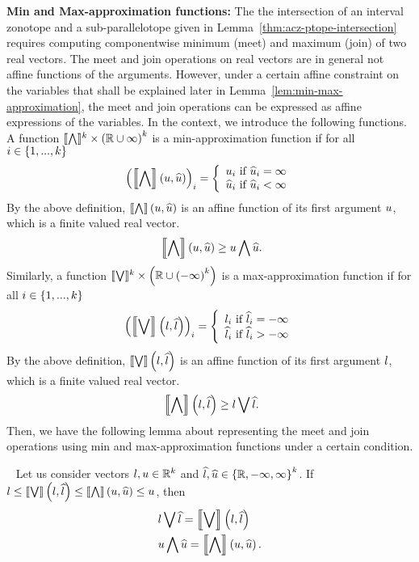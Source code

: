 %
{\bf Min and Max-approximation functions:} The
the intersection of an interval zonotope and a
sub-parallelotope given in Lemma~\ref{thm:acz-ptope-intersection}
requires computing componentwise minimum (meet) and maximum (join) of
two real vectors.  The meet and join operations on real vectors are in
general not affine functions of the arguments.  However, under a
certain affine constraint on the variables that shall be explained
later in Lemma~\ref{lem:min-max-approximation}, the meet and join operations can be
expressed as affine expressions of the variables.  In the context, we
introduce the following functions.  A function
$\minapproxsymbol:\reals^k\times\lt(\reals\cup\infty\rt)^k$ is a
min-approximation function if for all $i\in\set{1,...,k}$
%
\[
\lt(\minapprox{\ub}{\pub}\rt)_i=
\lt\{
\begin{array}{l}
\ub_i~\text{if}~\pub_i=\infty\\
\pub_i~\text{if}~\pub_i<\infty
\end{array}
\rt.
\]
%
By the above definition, $\minapprox{\ub}{\pub}$ is an affine function of its
first argument $\ub$, which is a finite valued real vector.
%
\begin{equation}~\label{eqn:minapprox}
\minapprox{\ub}{\pub}\geq\meet{\ub}{\pub}.
\end{equation}
%
Similarly, a function
$\maxapproxsymbol:\reals^k\times\lt(\reals\cup\lt(-\infty\rt)^k\rt)$
is a max-approximation function if for all $i\in\set{1,...,k}$
%
\[
\lt(\maxapprox{\lb}{\plb}\rt)_i=
\lt\{
\begin{array}{l}
\lb_i~\text{if}~\plb_i=-\infty\\
\plb_i~\text{if}~\plb_i>-\infty
\end{array}
\rt.
\]
%
By the above definition, $\maxapprox{\lb}{\plb}$ is an affine function
of its first argument $\lb$, which is a finite valued real vector.
%
\begin{equation}~\label{eqn:minapprox}
\minapprox{\lb}{\plb}\geq\join{\lb}{\plb}.
\end{equation}
%
Then, we have the following lemma about representing the meet and join
operations using min and max-approximation functions under a certain
condition.
%
\begin{lemma}~\label{lem:min-max-approximation}
Let us consider vectors $\lb,\ub\in\reals^k$ and
$\plb,\pub\in\set{\reals,-\infty,\infty}^k$.  If
$\lb\leq\maxapprox{\lb}{\plb}\leq\minapprox{\ub}{\pub}\leq\ub$, then
%
\begin{align*}
& \join{\lb}{\plb}=\maxapprox{\lb}{\plb}\\
& \meet{\ub}{\pub}=\minapprox{\ub}{\pub}.
\end{align*}
%
\end{lemma}

